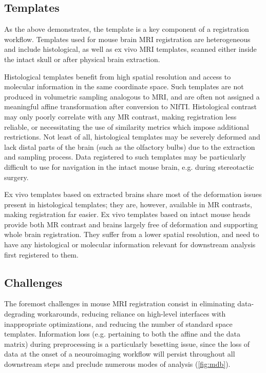 \subsection{Templates}
As the above demonstrates, the template is a key component of a registration workflow.
Templates used for mouse brain MRI registration are heterogeneous and include histological, as well as ex vivo MRI templates, scanned either inside the intact skull or after physical brain extraction.

Histological templates benefit from high spatial resolution and access to molecular information in the same coordinate space.
Such templates are not produced in volumetric sampling analogous to MRI, and are often not assigned a meaningful affine transformation after conversion to NIfTI.
Histological contrast may only poorly correlate with any MR contrast, making registration less reliable, or necessitating the use of similarity metrics which impose additional restrictions.
Not least of all, histological templates may be severely deformed and lack distal parts of the brain (such as the olfactory bulbs) due to the extraction and sampling process.
Data registered to such templates may be particularly difficult to use for navigation in the intact mouse brain, e.g. during stereotactic surgery.

Ex vivo templates based on extracted brains share most of the deformation issues present in histological templates;
they are, however, available in MR contrasts, making registration far easier.
Ex vivo templates based on intact mouse heads provide both MR contrast and brains largely free of deformation and supporting whole brain registration.
They suffer from a lower spatial resolution, and need to have any histological or molecular information relevant for downstream analysis first registered to them.

\subsection{Challenges}
The foremost challenges in mouse MRI registration consist in eliminating data-degrading workarounds, reducing reliance on high-level interfaces with inappropriate optimizations, and reducing the number of standard space templates.
Information loss (e.g. pertaining to both the affine and the data matrix) during preprocessing is a particularly besetting issue, since the loss of data at the onset of a neouroimaging workflow will persist throughout all downstream steps and preclude numerous modes of analysis (\cref{fig:mdb}).
